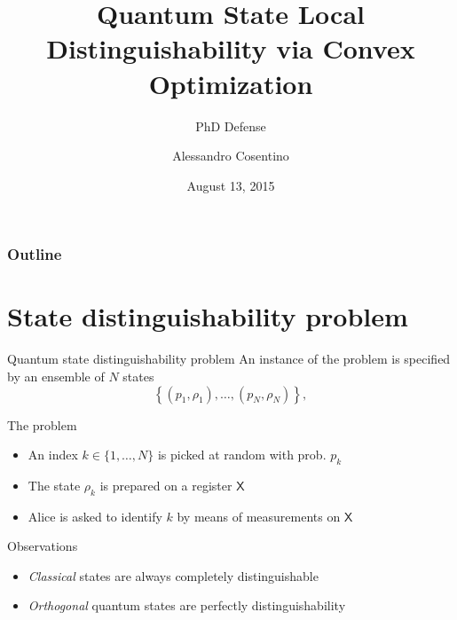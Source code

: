 \documentclass{beamer}
\title{Quantum State Local Distinguishability via Convex Optimization}
\subtitle{PhD Defense}
\author[A. Cosentino]{Alessandro Cosentino}
\institute[UWaterloo]{University of Waterloo}
\date{August 13, 2015}
\newcommand{\reg}[1]{\mathsf{#1}}
\begin{document}
  {%
    \frame{\titlepage}
  }

  \beamertemplatenavigationsymbolsempty

  \begin{frame}
    \frametitle{Outline}
    \tableofcontents%
  \end{frame}

  \section{State distinguishability problem}
    
    \begin{frame}{Quantum state distinguishability problem}
        An instance of the problem is specified by an ensemble of $N$ states
        \[
            \left\{(p_{1}, \rho_{1}), \ldots, (p_{N}, \rho_{N}) \right\},
        \]
        \begin{block}{The problem}
          \begin{itemize}
          \item An index $k\in\{1, \ldots, N\}$ is picked at random with prob. $p_{k}$
          \item The state $\rho_{k}$ is prepared on a register $\reg{X}$
          \item Alice is asked to identify $k$ by means of measurements on $\reg{X}$ 
          \end{itemize}
        \end{block}
        \begin{block}{Observations}
          \begin{itemize}
          \item \emph{Classical} states are always completely distinguishable
          \item \emph{Orthogonal} quantum states are perfectly distinguishability
          \end{itemize}
        \end{block}
    \end{frame}
\end{document}
